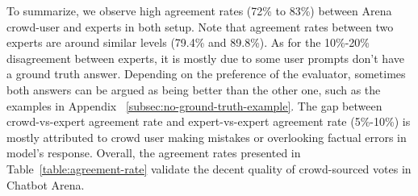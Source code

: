 \documentclass{article}
\newcommand{\system}{Chatbot Arena\xspace}
\begin{document}
To summarize, we observe high agreement rates (72\% to 83\%) between Arena crowd-user and experts in both setup. Note that agreement rates between two experts are around similar levels (79.4\% and 89.8\%). As for the 10\%-20\% disagreement between experts, it is mostly due to some user prompts don't have a ground truth answer. Depending on the preference of the evaluator, sometimes both answers can be argued as being better than the other one, such as the examples in Appendix ~\ref{subsec:no-ground-truth-example}.
The gap between crowd-vs-expert agreement rate and expert-vs-expert agreement rate (5\%-10\%) is mostly attributed to crowd user making mistakes or overlooking factual errors in model's response.
Overall, the agreement rates presented in Table~\ref{table:agreement-rate} validate the decent quality of crowd-sourced votes in \system.


\end{document}
